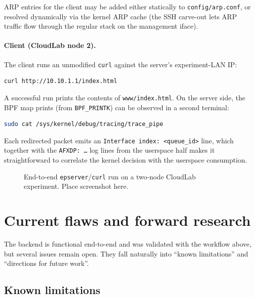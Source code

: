 \documentclass[10pt, letterpaper, twocolumn]{article}
\begin{document}
ARP entries for the client may be added either statically to \texttt{config/arp.conf}, or resolved dynamically via the kernel ARP cache (the SSH carve-out lets ARP traffic flow through the regular stack on the management iface).

\paragraph{Client (CloudLab node 2).} The client runs an unmodified \texttt{curl} against the server's experiment-LAN IP:
\begin{lstlisting}[language=bash]
curl http://10.10.1.1/index.html
\end{lstlisting}
A successful run prints the contents of \texttt{www/index.html}. On the server side, the BPF map prints (from \texttt{BPF\_PRINTK}) can be observed in a second terminal:
\begin{lstlisting}[language=bash]
sudo cat /sys/kernel/debug/tracing/trace_pipe
\end{lstlisting}
Each redirected packet emits an \texttt{Interface index: <queue\_id>} line, which together with the \texttt{AFXDP: \dots} log lines from the userspace half makes it straightforward to correlate the kernel decision with the userspace consumption.

\begin{figure}[htbp]
    \centering
    \caption{End-to-end \texttt{epserver}/\texttt{curl} run on a two-node CloudLab experiment. Place screenshot here.}
    \label{fig:run_curl}
\end{figure}
\FloatBarrier

\section{Current flaws and forward research}

The backend is functional end-to-end and was validated with the workflow above, but several issues remain open. They fall naturally into ``known limitations'' and ``directions for future work''.

\subsection{Known limitations}
\end{document}
